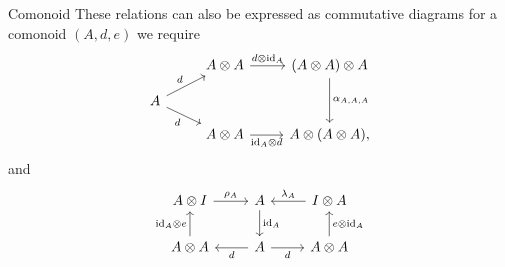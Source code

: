 \documentclass[fleqn]{NotesClass}
\DeclareMathOperator{\id}{id}
\begin{document}
\begin{dfn}{Comonoid}{}
        These relations can also be expressed as commutative diagrams for a comonoid \((A, d, e)\) we require
        \begin{equation}
            \begin{tikzcd}[row sep=small]
                & A \otimes A \arrow[r, "d \otimes \id_A"] & (A \otimes A) \otimes A \arrow[dd, "\alpha_{A,A,A}"]\\
                A \arrow[ur, "d"] \arrow[dr, "d"']\\
                & A \otimes A \arrow[r, "{\id_A} \otimes d"'] & A \otimes (A \otimes A),
            \end{tikzcd}
        \end{equation}
        and
        \begin{equation}
            \begin{tikzcd}
               A \otimes I \arrow[r, "\rho_A"] & A \arrow[d, "\id_A"] & I \otimes A \arrow[l, "\lambda_A"'] \\
               A \otimes A \arrow[u, "{\id_A} \otimes e"] & A \arrow[l, "d"] \arrow[r, "d"'] & A \otimes A \arrow[u, "e \otimes \id_A"']
            \end{tikzcd}
        \end{equation}
    \end{dfn}
    
\end{document}
